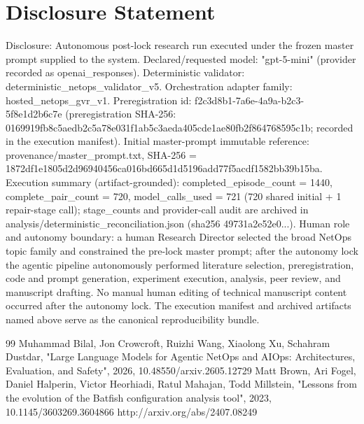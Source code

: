 \documentclass[conference]{IEEEtran}
\begin{document}
\section*{Disclosure Statement}
Disclosure: Autonomous post-lock research run executed under the frozen master prompt supplied to the system. Declared/requested model: "gpt-5-mini" (provider recorded as openai\_responses). Deterministic validator: deterministic\_netops\_validator\_v5. Orchestration adapter family: hosted\_netops\_gvr\_v1. Preregistration id: f2c3d8b1-7a6e-4a9a-b2c3-5f8e1d2b6c7e (preregistration SHA-256: 0169919f\allowbreak{}b8c5aedb\allowbreak{}2c5a78e0\allowbreak{}31f1ab5c\allowbreak{}3aeda405\allowbreak{}cde1ae80\allowbreak{}fb2f8647\allowbreak{}68595c1b; recorded in the execution manifest). Initial master-prompt immutable reference: provenance/master\_prompt.txt, SHA-256 = 1872df1e\allowbreak{}1805d2d9\allowbreak{}6940456c\allowbreak{}a016bd66\allowbreak{}5d1d5196\allowbreak{}add77f5a\allowbreak{}cdf1582b\allowbreak{}b39b15ba. Execution summary (artifact-grounded): completed\_episode\_count = 1440, complete\_pair\_count = 720, model\_calls\_used = 721 (720 shared initial + 1 repair-stage call); stage\_counts and provider-call audit are archived in analysis/deterministic\_reconciliation.json (sha256 49731a2e52e0...). Human role and autonomy boundary: a human Research Director selected the broad NetOps topic family and constrained the pre-lock master prompt; after the autonomy lock the agentic pipeline autonomously performed literature selection, preregistration, code and prompt generation, experiment execution, analysis, peer review, and manuscript drafting. No manual human editing of technical manuscript content occurred after the autonomy lock. The execution manifest and archived artifacts named above serve as the canonical reproducibility bundle.

\begin{thebibliography}{99}
 Muhammad Bilal, Jon Crowcroft, Ruizhi Wang, Xiaolong Xu, Schahram Dustdar, "Large Language Models for Agentic NetOps and AIOps: Architectures, Evaluation, and Safety", 2026, 10.48550/arxiv.2605.12729
 Matt Brown, Ari Fogel, Daniel Halperin, Victor Heorhiadi, Ratul Mahajan, Todd Millstein, "Lessons from the evolution of the Batfish configuration analysis tool", 2023, 10.1145/3603269.3604866
 http://arxiv.org/abs/2407.08249
\end{thebibliography}
\end{document}
